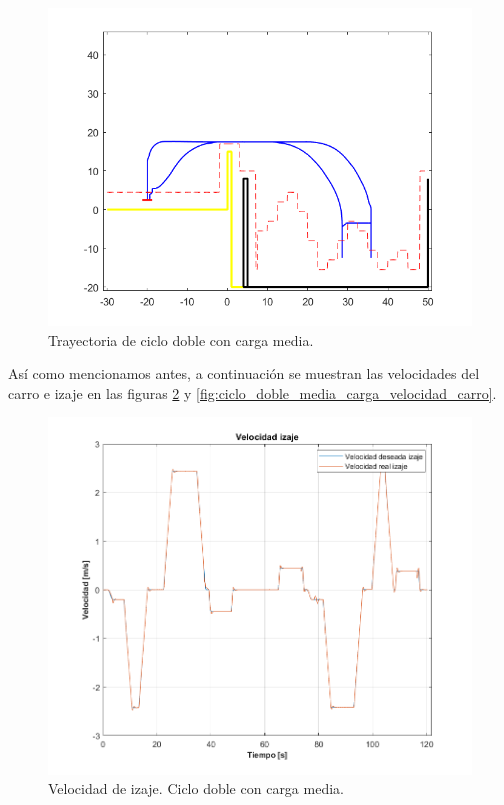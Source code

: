 \documentclass[11pt]{article}
\begin{document}
\begin{figure}[!h]
	\centering
	\includegraphics[width=1\textwidth]{images/ciclo_doble_carga_media/trayectoria_completa_xtd - copia.png}
	\caption{Trayectoria de ciclo doble con carga media.}
	\label{fig:ciclo_doble_media_carga_trayectoria}
\end{figure}

Así como mencionamos antes, a continuación se muestran las velocidades del carro e izaje en las figuras \ref{fig:ciclo_doble_media_carga_velocidad_izaje} y \ref{fig:ciclo_doble_media_carga_velocidad_carro}.

\begin{figure}%
	\centering
	\includegraphics[width=1\textwidth]{images/ciclo_doble_carga_media/velocidad_izaje - copia.png}
	\caption{Velocidad de izaje. Ciclo doble con carga media.}
	\label{fig:ciclo_doble_media_carga_velocidad_izaje}
\end{figure}
\end{document}
